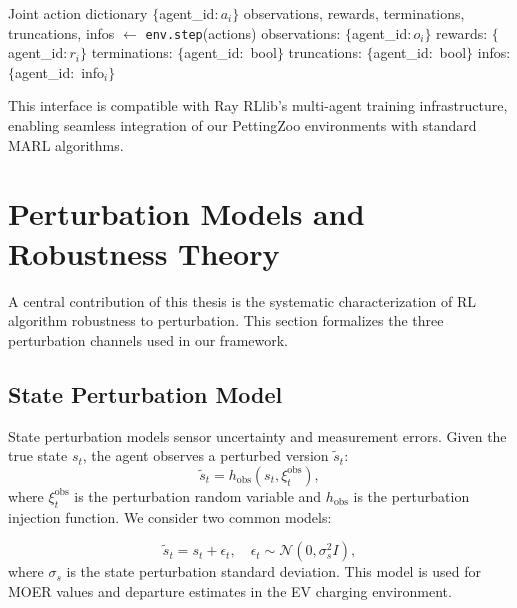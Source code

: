 \begin{algorithm}[htbp]
\caption{PettingZoo Parallel Environment Step}
\label{alg:pettingzoo}
\begin{algorithmic}[1]
\Require Joint action dictionary $\{$agent\_id$: a_i\}$
\State observations, rewards, terminations, truncations, infos $\gets$ \texttt{env.step}(actions)
\Ensure
\State \quad observations: $\{$agent\_id$: o_i\}$ 
\State \quad rewards: $\{$agent\_id$: r_i\}$ 
\State \quad terminations: $\{$agent\_id$:$ bool$\}$ 
\State \quad truncations: $\{$agent\_id$:$ bool$\}$ 
\State \quad infos: $\{$agent\_id$:$ info$_i\}$ 
\end{algorithmic}
\end{algorithm}

This interface is compatible with Ray RLlib's multi-agent training infrastructure, enabling seamless integration of our PettingZoo environments with standard MARL algorithms.

\section{Perturbation Models and Robustness Theory}
\label{sec:noise_models}

A central contribution of this thesis is the systematic characterization of RL algorithm robustness to perturbation. This section formalizes the three perturbation channels used in our framework.

\subsection{State Perturbation Model}

State perturbation models sensor uncertainty and measurement errors. Given the true state $s_t$, the agent observes a perturbed version $\tilde{s}_t$:
\begin{equation}
    \tilde{s}_t = h_{\text{obs}}(s_t, \xi_t^{\text{obs}}),
    \label{eq:obs_noise}
\end{equation}
where $\xi_t^{\text{obs}}$ is the perturbation random variable and $h_{\text{obs}}$ is the perturbation injection function. We consider two common models:

\begin{definition}
\begin{equation}
    \tilde{s}_t = s_t + \epsilon_t, \quad \epsilon_t \sim \mathcal{N}(0, \sigma_s^2 I),
\end{equation}
where $\sigma_s$ is the state perturbation standard deviation. This model is used for MOER values and departure estimates in the EV charging environment.
\end{definition}

